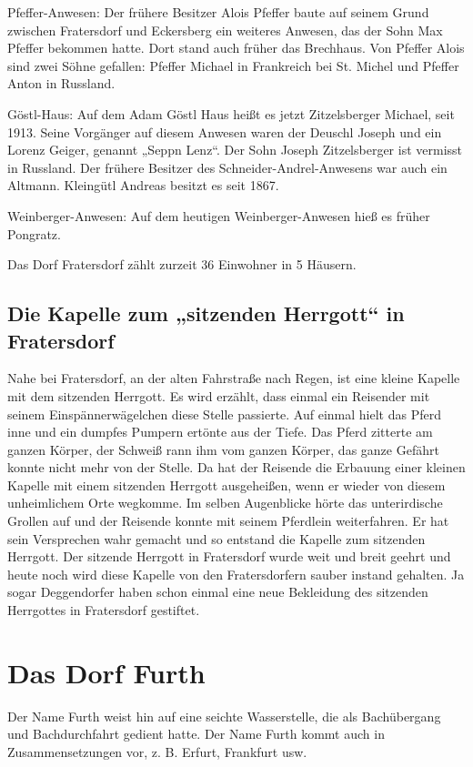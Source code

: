 \documentclass[12pt,a4pager]{book}
\begin{document}
Pfeffer-Anwesen: Der frühere Besitzer Alois Pfeffer baute auf seinem Grund
zwischen Fratersdorf und Eckersberg ein weiteres Anwesen, das der Sohn Max
Pfeffer bekommen hatte. Dort stand auch früher das Brechhaus. Von Pfeffer Alois
sind zwei Söhne gefallen: Pfeffer Michael in Frankreich bei St. Michel und
Pfeffer Anton in Russland.

Göstl-Haus: Auf dem Adam Göstl Haus heißt es jetzt Zitzelsberger Michael, seit
1913. Seine Vorgänger auf diesem Anwesen waren der Deuschl Joseph und ein Lorenz
Geiger, genannt „Seppn Lenz“. Der Sohn Joseph Zitzelsberger ist vermisst in
Russland. Der frühere Besitzer des Schneider-Andrel-Anwesens war auch ein
Altmann. Kleingütl Andreas besitzt es seit 1867.

Weinberger-Anwesen: Auf dem heutigen Weinberger-Anwesen hieß es früher Pongratz.

Das Dorf Fratersdorf zählt zurzeit 36 Einwohner in 5 Häusern.

\subsection{Die Kapelle zum „sitzenden Herrgott“ in Fratersdorf}

Nahe bei Fratersdorf, an der alten Fahrstraße nach Regen, ist eine kleine
Kapelle mit dem sitzenden Herrgott. Es wird erzählt, dass einmal ein Reisender
mit seinem Einspännerwägelchen diese Stelle passierte. Auf einmal hielt das
Pferd inne und ein dumpfes Pumpern ertönte aus der Tiefe. Das Pferd zitterte am
ganzen Körper, der Schweiß rann ihm vom ganzen Körper, das ganze Gefährt konnte
nicht mehr von der Stelle. Da hat der Reisende die Erbauung einer kleinen
Kapelle mit einem sitzenden Herrgott ausgeheißen, wenn er wieder von diesem
unheimlichem Orte wegkomme. Im selben Augenblicke hörte das unterirdische
Grollen auf und der Reisende konnte mit seinem Pferdlein weiterfahren. Er hat
sein Versprechen wahr gemacht und so entstand die Kapelle zum sitzenden
Herrgott. Der sitzende Herrgott in Fratersdorf wurde weit und breit geehrt und
heute noch wird diese Kapelle von den Fratersdorfern sauber instand gehalten. Ja
sogar Deggendorfer haben schon einmal eine neue Bekleidung des sitzenden
Herrgottes in Fratersdorf gestiftet.

\section{Das Dorf Furth}

Der Name Furth weist hin auf eine seichte Wasserstelle, die als Bachübergang und
Bachdurchfahrt gedient hatte. Der Name Furth kommt auch in Zusammensetzungen
vor, z. B. Erfurt, Frankfurt usw.
\end{document}
